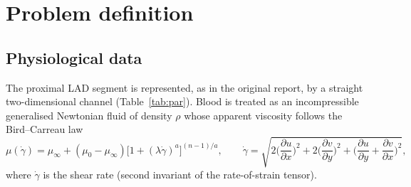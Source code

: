 \section{Problem definition}
\subsection{Physiological data}
The proximal LAD segment is represented, as in the original report, by a straight two-dimensional channel (Table~\ref{tab:par}). Blood is treated as an incompressible generalised Newtonian fluid of density $\rho$ whose apparent viscosity follows the Bird--Carreau law
\begin{equation}
\mu(\dot\gamma)=\mu_\infty+(\mu_0-\mu_\infty)\big[1+(\lambda\dot\gamma)^{a}\big]^{(n-1)/a},\qquad
\dot\gamma=\sqrt{2\Big(\frac{\partial u}{\partial x}\Big)^2+2\Big(\frac{\partial v}{\partial y}\Big)^2+\Big(\frac{\partial u}{\partial y}+\frac{\partial v}{\partial x}\Big)^2}, \label{eq:carreau}
\end{equation}
where $\dot\gamma$ is the shear rate (second invariant of the rate-of-strain tensor).
\begin{table}[H]\centering\small
{}\caption{Parameters. $^\dagger$The widely used fit of Cho \& Kensey (1991) has $\mu_\infty=0.00345$ Pa\,s, $\lambda=3.313$ s, $n=0.3568$; the values of the original project are kept here.}\label{tab:par}\end{table}


